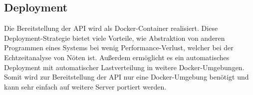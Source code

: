     \subsection{Deployment}
        Die Bereitstellung der API wird als Docker-Container realisiert.
        Diese Deployment-Strategie bietet viele Vorteile, wie Abstraktion von anderen Programmen eines Systems bei wenig Performance-Verlust, welcher bei der Echtzeitanalyse von Nöten ist.
        Außerdem ermöglicht es ein automatisches Deployment mit automatischer Lastverteilung in weitere Docker-Umgebungen.
        Somit wird zur Bereitstellung der API nur eine Docker-Umgebung benötigt und kann sehr einfach auf weitere Server portiert werden.
